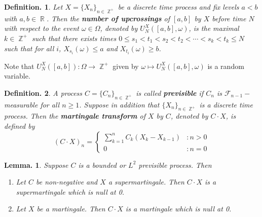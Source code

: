 \documentclass[11pt, a4paper]{memoir}
\DeclareMathOperator{\Z}{{\mathbb{Z}}}
\DeclareMathOperator{\R}{{\mathbb{R}}}
\theoremstyle{change}
\newtheorem{lemma}[theorem]{Lemma.}
\theoremstyle{plain}
\theoremstyle{nonumberplain}
\newtheorem{definition}{Definition.}
\newcommand{\defn}[1]{{\boldmath\bfseries #1}}
\numberwithin{equation}{section}
\begin{document}
\begin{definition}
    Let $X=\{X_n\}_{n\in\Z^+}$ be a discrete time process and fix levels $a<b$ with $a,b\in\R$.
    Then the \defn{number of upcrossings} of $[a,b]$ by $X$ before time $N$ with respect to the event $\omega\in\Omega$, denoted by $U_N^X([a,b],\omega)$, is the maximal $k\in\Z^+$ such that there exists times $0\leq s_1<t_1<s_2<t_2<\cdots<s_k<t_k\leq N$ such that for all $i$, $X_{s_i}(\omega)\leq a$ and $X_{t_i}(\omega)\geq b$.
\end{definition}
Note that $U_N^X([a,b]):\Omega\to\Z^+$ given by $\omega\mapsto U_N^X([a,b],\omega)$ is a random variable.
\begin{definition}
    A process $C=\{C_n\}_{n\in\Z^+}$ is called \defn{previsible} if $C_n$ is $\mathcal{F}_{n-1}-$measurable for all $n\geq 1$.
    Suppose in addition that $\{X_n\}_{n\in\Z^+}$ is a discrete time process.
    Then the \defn{martingale transform} of $X$ by $C$, denoted by $C\cdot X$, is defined by
    \begin{equation*}
        (C\cdot X)_n=
        \begin{cases}
            \sum_{k=1}^n C_k(X_k-X_{k-1}) &: n>0\\
            0 &: n=0
        \end{cases}
    \end{equation*}
\end{definition}
\begin{lemma}\label{l:previs}
    Suppose $C$ is a bounded or $L^2$ previsible process.
    Then
    \begin{enumerate}[nl,r]
        \item Let $C$ be non-negative and $X$ a supermartingale.
            Then $C\cdot X$ is a supermartingale which is null at 0.
        \item Let $X$ be a martingale.
            Then $C\cdot X$ is a martingale which is null at 0.
    \end{enumerate}
\end{lemma}
\end{document}
